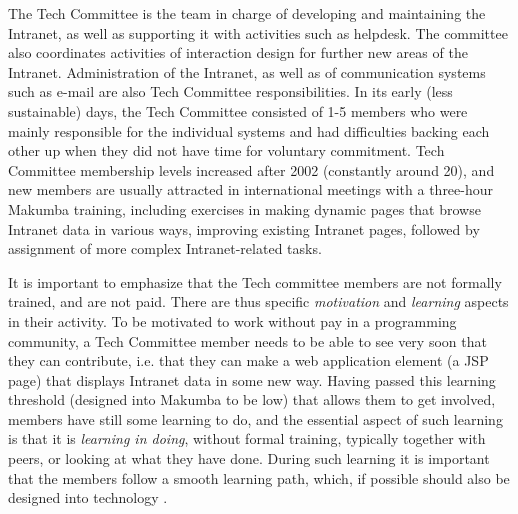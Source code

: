 \documentclass{llncs}
\begin{document}
The Tech Committee is the team in charge of developing and maintaining the Intranet, as well as supporting it with activities such as helpdesk. The committee also coordinates activities of interaction design for further new areas of the Intranet. Administration of the Intranet, as well as of communication systems such as e-mail are also Tech Committee responsibilities. In its early (less sustainable) days, the Tech Committee consisted of 1-5 members who were mainly responsible for the individual systems and had difficulties backing each other up when they did not have time for voluntary commitment. Tech Committee membership levels increased after 2002 (constantly around 20), and new members are usually attracted in international meetings with a three-hour Makumba training, including exercises in making dynamic pages that browse Intranet data in various ways, improving existing Intranet pages, followed by assignment of more complex Intranet-related tasks.



It is important to emphasize that the Tech committee members are not formally trained, and are not paid. There are thus specific \textit{motivation} and \textit{learning} aspects in their activity. To be motivated to work without pay in a programming community, a Tech Committee member needs to be able to see very soon that they can contribute, i.e. that they can make a web application element (a JSP page) that displays Intranet data in some new way. Having passed this learning threshold (designed into Makumba to be low) that allows them to get involved, members have still some learning to do, and the essential aspect of such learning is that it is \textit {learning in doing}, without formal training, typically together with peers, or looking at what they have done. During such learning it is important that the members follow a smooth learning path, which, if possible should also be designed into technology \cite{bogdan_mayer09}.

\end{document}
